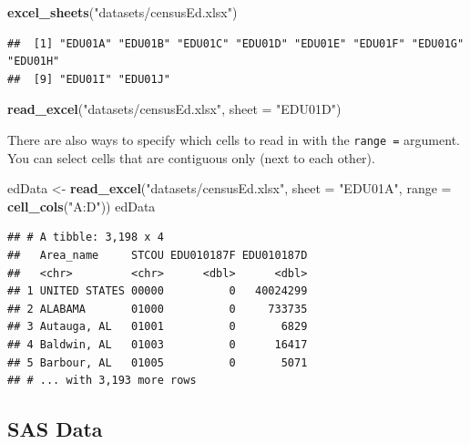 \documentclass[
]{book}
\newenvironment{Shaded}{\begin{snugshade}}{\end{snugshade}}
\newcommand{\DataTypeTok}[1]{\textcolor[rgb]{0.13,0.29,0.53}{#1}}
\newcommand{\KeywordTok}[1]{\textcolor[rgb]{0.13,0.29,0.53}{\textbf{#1}}}
\newcommand{\NormalTok}[1]{#1}
\newcommand{\StringTok}[1]{\textcolor[rgb]{0.31,0.60,0.02}{#1}}
\theoremstyle{definition}
\theoremstyle{definition}
\theoremstyle{definition}
\theoremstyle{remark}
\begin{document}
\begin{Shaded}
\begin{Highlighting}[]
\KeywordTok{excel_sheets}\NormalTok{(}\StringTok{"datasets/censusEd.xlsx"}\NormalTok{)}
\end{Highlighting}
\end{Shaded}

\begin{verbatim}
##  [1] "EDU01A" "EDU01B" "EDU01C" "EDU01D" "EDU01E" "EDU01F" "EDU01G" "EDU01H"
##  [9] "EDU01I" "EDU01J"
\end{verbatim}

\begin{Shaded}
\begin{Highlighting}[]
\KeywordTok{read_excel}\NormalTok{(}\StringTok{"datasets/censusEd.xlsx"}\NormalTok{, }\DataTypeTok{sheet =} \StringTok{"EDU01D"}\NormalTok{)}
\end{Highlighting}
\end{Shaded}

There are also ways to specify which cells to read in with the \texttt{range\ =} argument. You can select cells that are contiguous only (next to each other).

\begin{Shaded}
\begin{Highlighting}[]
\NormalTok{edData <-}\StringTok{ }\KeywordTok{read_excel}\NormalTok{(}\StringTok{"datasets/censusEd.xlsx"}\NormalTok{, }\DataTypeTok{sheet =} \StringTok{"EDU01A"}\NormalTok{, }
                   \DataTypeTok{range =} \KeywordTok{cell_cols}\NormalTok{(}\StringTok{"A:D"}\NormalTok{))}
\NormalTok{edData}
\end{Highlighting}
\end{Shaded}

\begin{verbatim}
## # A tibble: 3,198 x 4
##   Area_name     STCOU EDU010187F EDU010187D
##   <chr>         <chr>      <dbl>      <dbl>
## 1 UNITED STATES 00000          0   40024299
## 2 ALABAMA       01000          0     733735
## 3 Autauga, AL   01001          0       6829
## 4 Baldwin, AL   01003          0      16417
## 5 Barbour, AL   01005          0       5071
## # ... with 3,193 more rows
\end{verbatim}

\hypertarget{sas-data-1}{%
\subsection{SAS Data}\label{sas-data-1}}
\end{document}
